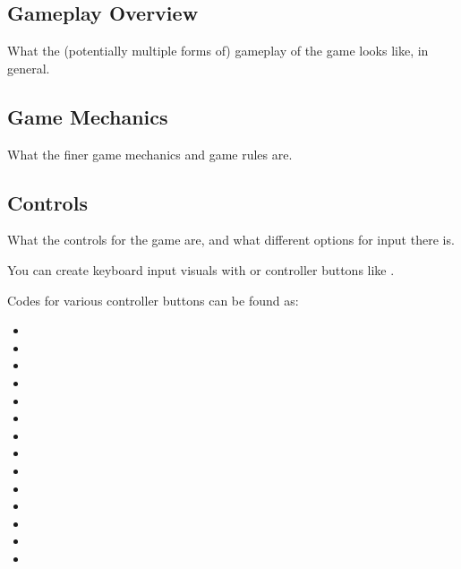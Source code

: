 \subsection{Gameplay Overview}
What the (potentially multiple forms of) gameplay of the game looks like, in general.
\subsection{Game Mechanics}
What the finer game mechanics and game rules are.
\subsection{Controls}
What the controls for the game are, and what different options for input there is.

You can create keyboard input visuals with  or controller buttons like \controllerA.

Codes for various controller buttons can be found as:
\begin{itemize}
\item \controllerA \hspace{1pt} \texttt{\controllerA}
\item \controllerB \hspace{1pt} \texttt{\controllerB}
\item \controllerX \hspace{1pt} \texttt{\controllerX}
\item \controllerY \hspace{1pt} \texttt{\controllerY}
\item \controllerDpad \hspace{1pt} \texttt{\controllerDpad}
\item \controllerDpadUp \hspace{1pt} \texttt{\controllerDpadUp}
\item \controllerDpadLeft \hspace{1pt} \texttt{\controllerDpadLeft}
\item \controllerDpadDown \hspace{1pt} \texttt{\controllerDpadDown}
\item \controllerDpadRight \hspace{1pt} \texttt{\controllerDpadRight}
\item \controllerJoystick \hspace{1pt} \texttt{\controllerJoystick}
\item \controllerJoystickUp \hspace{1pt} \texttt{\controllerJoystickUp}
\item \controllerJoystickLeft \hspace{1pt} \texttt{\controllerJoystickLeft}
\item \controllerJoystickDown \hspace{1pt} \texttt{\controllerJoystickDown}
\item \controllerJoystickRight \hspace{1pt} \texttt{\controllerJoystickRight}
\end{itemize}

